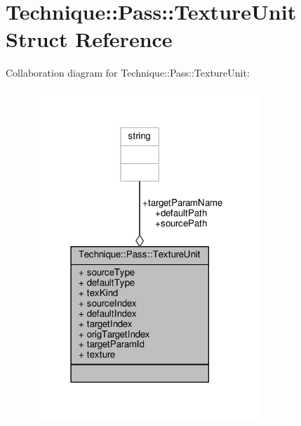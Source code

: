 \hypertarget{structTechnique_1_1Pass_1_1TextureUnit}{}\section{Technique\+:\+:Pass\+:\+:Texture\+Unit Struct Reference}
\label{structTechnique_1_1Pass_1_1TextureUnit}


Collaboration diagram for Technique\+:\+:Pass\+:\+:Texture\+Unit\+:
\nopagebreak
\begin{figure}[H]
\begin{center}
\leavevmode
\includegraphics[width=243pt]{d5/d64/structTechnique_1_1Pass_1_1TextureUnit__coll__graph}
\end{center}
\end{figure}
